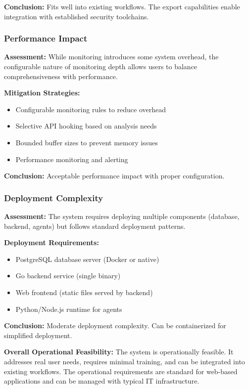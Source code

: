 \textbf{Conclusion:} Fits well into existing workflows. The export capabilities enable integration with established security toolchains.

\subsubsection{Performance Impact}

\textbf{Assessment:} While monitoring introduces some system overhead, the configurable nature of monitoring depth allows users to balance comprehensiveness with performance.

\textbf{Mitigation Strategies:}
\begin{itemize}
    \item Configurable monitoring rules to reduce overhead
    \item Selective API hooking based on analysis needs
    \item Bounded buffer sizes to prevent memory issues
    \item Performance monitoring and alerting
\end{itemize}

\textbf{Conclusion:} Acceptable performance impact with proper configuration.

\subsubsection{Deployment Complexity}

\textbf{Assessment:} The system requires deploying multiple components (database, backend, agents) but follows standard deployment patterns.

\textbf{Deployment Requirements:}
\begin{itemize}
    \item PostgreSQL database server (Docker or native)
    \item Go backend service (single binary)
    \item Web frontend (static files served by backend)
    \item Python/Node.js runtime for agents
\end{itemize}

\textbf{Conclusion:} Moderate deployment complexity. Can be containerized for simplified deployment.

\textbf{Overall Operational Feasibility:} The system is operationally feasible. It addresses real user needs, requires minimal training, and can be integrated into existing workflows. The operational requirements are standard for web-based applications and can be managed with typical IT infrastructure.


